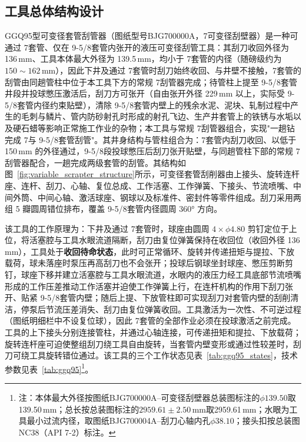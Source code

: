 
\subsection{工具总体结构设计}
\label{kebianjingguaguan}
GGQ95型可变径套管刮管器（图纸型号BJG700000A，7\inch 可变径刮壁器）是一种可通过 7\inch 套管、仅在 9-5/8\inch 套管内张开的液压可变径刮管工具：其刮刀收回外径为 136\,mm、工具本体最大外径为 139.5\,mm，均小于 7\inch 套管的内径（随磅级约为 $150\sim162$\,mm），因此下井及通过 7\inch 套管时刮刀始终收回、与井壁不接触，7\inch 套管的刮管由同趟管柱中位于本工具下方的常规 7\inch 刮管器完成；待管柱上提至 9-5/8\inch 套管井段并投球憋压激活后，刮刀方可张开（自由张开外径 229\,mm 以上，实际受 9-5/8\inch 套管内径约束贴壁），清除 9-5/8\inch 套管内壁上的残余水泥、泥块、轧制过程中产生的毛刺与鳞片、管内防砂射孔时形成的射孔飞边、生产井套管上的铁锈与水垢以及硬石蜡等影响正常施工作业的杂物；本工具与常规 7\inch 刮管器组合，实现"一趟钻完成 7\inch 与 9-5/8\inch 套管刮管"。其井身结构与管柱组合为：7\inch 套管内刮刀收回、以低于 150\,mm 的外径通过，9-5/8\inch 段投球憋压后刮刀张开贴壁，与同趟管柱下部的常规 7\inch 刮管器配合，一趟完成两级套管的刮管。其结构如图~\ref{fig:variable_scrapter_structure}所示，可变径套管刮削器由上接头、旋转连杆座、连杆、刮刀、心轴、复位总成、工作活塞、工作弹簧、下接头、节流喷嘴、中间外筒、中间心轴、激活球座、钢球以及标准件、密封件等零件组成。刮刀采用两组 5 瓣圆周错位排布，覆盖 9-5/8\inch 套管内径圆周 360° 方向。

该工具的工作原理为：下井及通过 7\inch 套管时，球座由圆周 $4\times\phi 4.80$ 剪钉定位于上位，将活塞腔与工具水眼流道隔断，刮刀由复位弹簧保持在收回位（收回外径 136\,mm），工具处于\textbf{收回待命状态}，此时可正常循环、旋转并传递扭矩与提拉、下放载荷，球未落座时泵压再高刮刀也不会张开；投球后钢球坐封球座、憋压剪断剪钉，球座下移并建立活塞腔与工具水眼流道，水眼内的液压力经工具底部节流喷嘴形成的工作压差推动工作活塞并迫使工作弹簧上行，在连杆机构的作用下刮刀张开、贴紧 9-5/8\inch 套管内壁；随后上提、下放管柱即可实现刮刀对套管内壁的刮削清洁，停泵后节流压差消失、刮刀由复位弹簧收回。工具激活为一次性、不可逆过程（图纸明细栏中不设复位球），因此 7\inch 套管的全部作业必须在投球激活之前完成。工具的上下接头分别连接管柱，并通过心轴连接，可传递扭矩和提拉、下放载荷；旋转连杆座可迫使整组刮刀绕工具自由旋转，当套管内壁变形或通过性较差时，刮刀可绕工具旋转错位通过。该工具的三个工作状态见表~\ref{tab:ggq95_states}，技术参数见表~\ref{tab:ggq95}\footnote{注：本体最大外径按图纸BJG700000A--可变径刮壁器总装图标注的$\phi 139.50$取139.50\,mm；总长按总装图标注的$2959.61\pm 2.50\,\text{mm}$取2959.61\,mm；水眼为工具最小过流内径，取图纸BJG700004A--刮刀心轴内孔$\phi 38.10$；接头扣按总装图NC38（API 7-2）标注。}。

